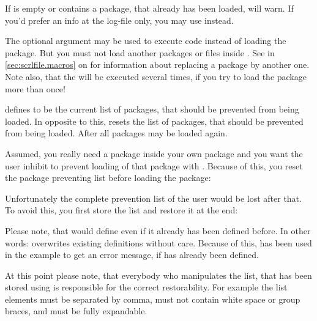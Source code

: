 If  is empty or contains a package, that already has been
loaded,  will warn. If you'd prefer an
info at the log-file only, you may use
 instead.

The optional argument may be used to
execute code instead of loading the package. But you must not load another
packages or files inside . See
 in \autoref{sec:scrlfile.macros} on
 for information about replacing a
package by another one. Note also, that the  will be
executed several times, if you try to load the package more than once!%
\EndIndexGroup


\begin{Declaration}
\end{Declaration}
defines  to be the current list of packages, that should be
prevented from being loaded. In opposite to this,
resets the list of packages, that should be prevented from being loaded. After
 all packages may be loaded again.
\begin{Example}
  Assumed, you really need a package inside your own package and you want the
  user inhibit to prevent loading of that package with
  . Because of this, you reset the package
  preventing list before loading the package:
\begin{lstcode}
  \ResetPreventPackageFromLoading
  \RequirePackage{foo}
\end{lstcode}
  Unfortunately the complete prevention list of the user would be lost after
  that. To avoid this, you first store the list and restore it at the end:
\begin{lstcode}
  \newcommand*{\Users@PreventList}{}%
  \StorePreventPackageFromLoading\Users@PreventList
  \ResetPreventPackageFromLoading
  \RequirePackage{foo}
  \PreventPackageFromLoading{\Users@PreventList}
\end{lstcode}
  Please note, that
   would define
   even if it already has been defined before. In other
  words:  overwrites existing
   definitions without care. Because of this,
   has been used in the example to get an error message, if
   has already been defined.
\end{Example}
At this point please note, that everybody who manipulates the list, that has
been stored using  is responsible for
the correct restorability. For example the list elements must be separated by
comma, must not contain white space or group braces, and must be fully
expandable.

